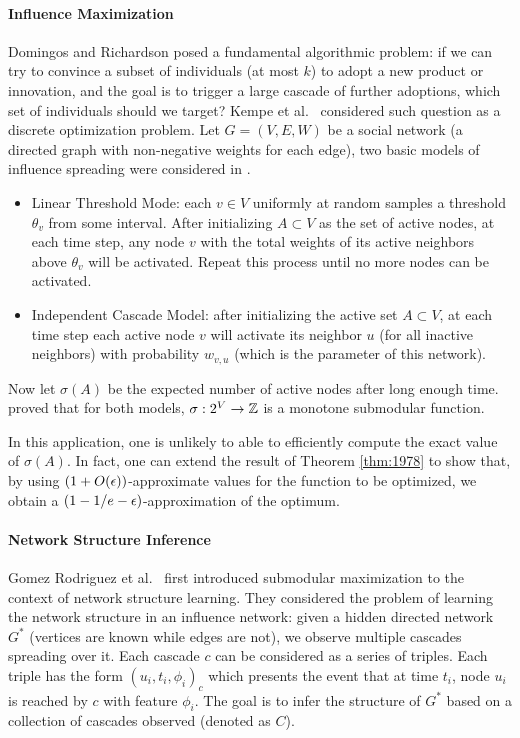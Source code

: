 \paragraph{Influence Maximization}
Domingos and Richardson \cite{DR01,RD02} posed a fundamental algorithmic problem: if we can try to convince a subset of individuals (at most $k$) to adopt a new product or innovation, and the goal is to trigger a large cascade of further adoptions, which set of individuals should we target? 
Kempe et al.\ \cite{KKT03} considered such question as a discrete optimization problem. Let $G = (V, E, W)$ be a social network (a directed graph with non-negative weights for each edge), two basic models of influence spreading were considered in \cite{KKT03}.
\begin{itemize}
\item Linear Threshold Mode: each $v\in V$ uniformly at random samples a threshold $\theta_v$ from some interval. After initializing $A \subset V$ as the set of active nodes, at each time step, any node $v$ with the total weights of its active neighbors above $\theta_v$ will be activated. Repeat this process until no more nodes can be activated. 

\item Independent Cascade Model:  after initializing the active set $A \subset V$, at each time step each active node $v$ will activate its neighbor $u$ (for all inactive neighbors) with probability $w_{v,u}$ (which is the parameter of this network).
\end{itemize}

Now let $\sigma(A)$ be the expected number of active nodes after long enough time. \cite{KKT03} proved that for both models, $\sigma: 2^V \rightarrow \mathbb{Z}$ is a monotone submodular function.


In this application, one is unlikely to able to efficiently compute the exact value of $\sigma(A)$. In fact, one can extend the result of Theorem \ref{thm:1978} to show that, by using  $(1 + O(\epsilon))$-approximate values for the function to be optimized, we obtain a $(1 - 1/e - \epsilon)$-approximation of the optimum.


\paragraph{Network Structure Inference}
Gomez Rodriguez et al.\ \cite{GLK10} first introduced submodular maximization to the context of network structure learning. They considered the problem of learning the network structure in an influence network: given a hidden directed network $G^*$ (vertices are known while edges are not), we observe multiple cascades spreading over it. Each cascade $c$ can be considered as a series of triples. Each triple has the form $(u_i, t_i, \phi_i)_c$ which presents the event that at time $t_i$, node $u_i$ is reached by $c$ with feature $\phi_i$. The goal is to infer the structure of $G^*$ based on a collection of cascades observed (denoted as $C$).

